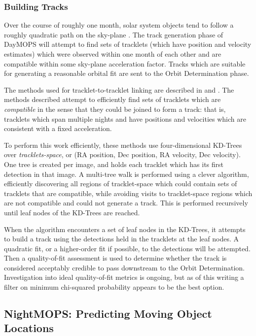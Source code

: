 \documentclass[12pt,preprint]{aastex}
\begin{document}
\subsubsection{Building Tracks}

Over the course of roughly one month, solar system objects tend to
follow a roughly quadratic path on the sky-plane
\citep{kubica_thesis}.  The track generation phase of DayMOPS will
attempt to find sets of tracklets (which have position and velocity
estimates) which were observed within one month of each other and are
compatible within some sky-plane acceleration factor.  Tracks which
are suitable for generating a reasonable orbital fit are sent to the
Orbit Determination phase. 

The methods used for tracklet-to-tracklet linking are described in
\citet{kubica_thesis} and \citet{Kubica:2005:MTA:1081870.1081889}.
The methods described attempt to efficiently find sets of tracklets
which are \textit{compatible} in the sense that they could be joined
to form a track: that is, tracklets which span multiple nights and
have positions and velocities which are consistent with a fixed
acceleration.  

To perform this work efficiently, these methods use four-dimensional
KD-Trees over \textit{tracklets-space}, or (RA position, Dec position,
RA velocity, Dec velocity). One tree is created per image, and holds
each tracklet which has its first detection in that image.  A
multi-tree walk is performed using a clever algorithm, efficiently
discovering all regions of tracklet-space which could contain sets of
tracklets that are compatible, while avoiding visits to tracklet-space
regions which are not compatible and could not generate a track.  This
is performed recursively until leaf nodes of the KD-Trees are reached.


When the algorithm encounters a set of leaf nodes in the KD-Trees, it
attempts to build a track using the detections held in the tracklets
at the leaf nodes.  A quadratic fit, or a higher-order fit if
possible, to the detections will be attempted.  Then a quality-of-fit
assessment is used to determine whether the track is considered
acceptably credible to pass downstream to the Orbit Determination.
Investigation into ideal quality-of-fit metrics is ongoing, but as of
this writing a filter on minimum chi-squared probability appears to be
the best option.



\subsection{NightMOPS: Predicting Moving Object Locations}
\end{document}
